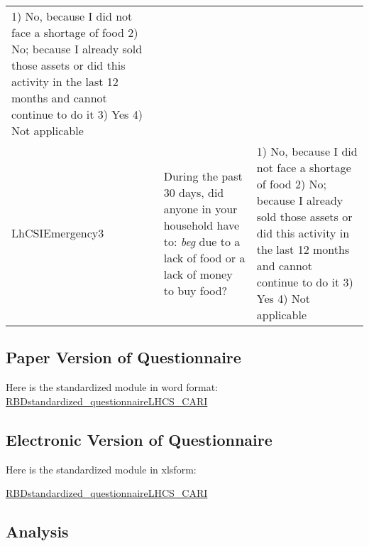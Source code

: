 \documentclass[
]{book}
\begin{document}
\begin{longtable}[]{@{}lll@{}}
\begin{minipage}[t]{0.27\columnwidth}
1) No, because I did not face a shortage of food 2) No; because I already sold those assets or did this activity in the last 12 months and cannot continue to do it 3) Yes 4) Not applicable\strut
\end{minipage}\tabularnewline
\begin{minipage}[t]{0.15\columnwidth}\raggedright
LhCSIEmergency3\strut
\end{minipage} & \begin{minipage}[t]{0.49\columnwidth}\raggedright
During the past 30 days, did anyone in your household have to: \emph{beg } due to a lack of food or a lack of money to buy food?\strut
\end{minipage} & \begin{minipage}[t]{0.27\columnwidth}\raggedright
1) No, because I did not face a shortage of food 2) No; because I already sold those assets or did this activity in the last 12 months and cannot continue to do it 3) Yes 4) Not applicable\strut
\end{minipage}\tabularnewline
\bottomrule
\end{longtable}

\hypertarget{paper-version-of-questionnaire-3}{%
\subsection{Paper Version of Questionnaire}\label{paper-version-of-questionnaire-3}}

Here is the standardized module in word format:
\href{https://github.com/WFP-VAM/RBD_FS_CH_guide_EN/blob/master/questionnaires/RBDstandardized_questionnaireLHCS_CARI.docx}{RBDstandardized\_questionnaireLHCS\_CARI}

\hypertarget{electronic-version-of-questionnaire-3}{%
\subsection{Electronic Version of Questionnaire}\label{electronic-version-of-questionnaire-3}}

Here is the standardized module in xlsform:

\href{https://github.com/WFP-VAM/RBD_FS_CH_guide_EN/blob/master/questionnaires/RBDstandardized_questionnaireLHCS_CARI.xlsx}{RBDstandardized\_questionnaireLHCS\_CARI}

\hypertarget{analysis}{%
\subsection{Analysis}\label{analysis}}
\end{document}
